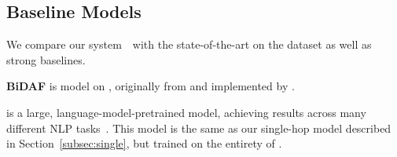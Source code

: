 \begin{comment}
\begin{table}[tb]
    \centering
    \footnotesize
    \begin{tabular}{l|c|c|c} 
     \toprule
     {Model} & {All} & {Bridge} & {Comp}  \\
     \midrule
        \sys & 59.07 & 58.40 & 61.70 \\
        \sys--No MhQA & 58.30 & 57.50 & 61.52 \\
     \midrule
        \bert{} & 44.68 & 42.80  & 52.17 \\
     \bottomrule
\end{tabular}
\caption{\textbf{Robustness Text I.} F1 score on the new dev set made up with a different set of distractors.
\sys{} is our model, \sys{}--No MhQA is our model trained on only single-hop QA data and 400 decomposition annotations. \bert{} is the baseline model.
} 
\label{tab:newdist-result}
\vspace{-8pt}
\end{table}

\begin{table}[tb]
    \centering
    \footnotesize
    \begin{tabular}{l|c|c|c} 
     \toprule
      Model & Orig F1 & Inv F1 & Min F1 \\
     \midrule
        \sys & 67.80 & 65.78 & 55.80 \\
        \bert & 54.65 & 32.49 & 19.27 \\
     \bottomrule
\end{tabular}
\caption{\textbf{Robustness Text II.} F1 score on a subset of binary comparison questions. {\em Orig F1}, {\em Inv F1} and {\em Min F1} indicate F1 score on the original example, the inverted example and the minimum of two, respectively.
} 
\label{tab:comp-robust}
\vspace{-8pt}
\end{table}
\end{comment} 
\subsection{Baseline Models}
We compare our system~\sys\ with the state-of-the-art on the \hotpot{} dataset as well as strong baselines. 

\vspace{.1cm}
\noindent \textbf{BiDAF} is \sota{} \RC{} model on \hotpot{}, originally from \citet{bidaf} and implemented by \citet{hotpot}.

\vspace{.1cm}
\noindent \textbf{\bert} is a large, language-model-pretrained model, achieving \sota{} results across many different NLP tasks~\citep{bert}.
This model is the same as our single-hop model described in Section~\ref{subsec:single}, but trained on the entirety of \hotpot{}.

